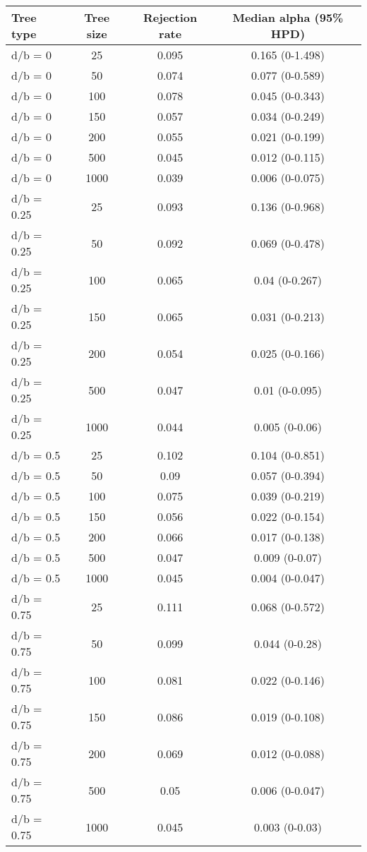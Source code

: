 \begin{tabular}{lccc}
     \hline
     \textbf{Tree type} & \textbf{Tree size} & \textbf{Rejection rate}  & \textbf{Median alpha (95\% HPD)}    \\
     \hline
     d/b = 0 & 25  & 0.095 & 0.165 (0-1.498)   \\
     d/b = 0 & 50  & 0.074 & 0.077 (0-0.589)   \\
     d/b = 0 & 100 & 0.078 & 0.045 (0-0.343)   \\
     d/b = 0 & 150 & 0.057 & 0.034 (0-0.249)   \\
     d/b = 0 & 200 & 0.055 & 0.021 (0-0.199)   \\
     d/b = 0 & 500 & 0.045 & 0.012 (0-0.115)   \\
     d/b = 0 & 1000  & 0.039 & 0.006 (0-0.075)   \\
     d/b = 0.25  & 25  & 0.093 & 0.136 (0-0.968)   \\
     d/b = 0.25  & 50  & 0.092 & 0.069 (0-0.478)   \\
     d/b = 0.25  & 100 & 0.065 & 0.04 (0-0.267)    \\
     d/b = 0.25  & 150 & 0.065 & 0.031 (0-0.213)   \\
     d/b = 0.25  & 200 & 0.054 & 0.025 (0-0.166)   \\
     d/b = 0.25  & 500 & 0.047 & 0.01 (0-0.095)    \\
     d/b = 0.25  & 1000  & 0.044 & 0.005 (0-0.06)    \\
     d/b = 0.5 & 25  & 0.102 & 0.104 (0-0.851)   \\
     d/b = 0.5 & 50  & 0.09  & 0.057 (0-0.394)   \\
     d/b = 0.5 & 100 & 0.075 & 0.039 (0-0.219)   \\
     d/b = 0.5 & 150 & 0.056 & 0.022 (0-0.154)   \\
     d/b = 0.5 & 200 & 0.066 & 0.017 (0-0.138)   \\
     d/b = 0.5 & 500 & 0.047 & 0.009 (0-0.07)    \\
     d/b = 0.5 & 1000  & 0.045 & 0.004 (0-0.047)   \\
     d/b = 0.75  & 25  & 0.111 & 0.068 (0-0.572)   \\
     d/b = 0.75  & 50  & 0.099 & 0.044 (0-0.28)    \\
     d/b = 0.75  & 100 & 0.081 & 0.022 (0-0.146)   \\
     d/b = 0.75  & 150 & 0.086 & 0.019 (0-0.108)   \\
     d/b = 0.75  & 200 & 0.069 & 0.012 (0-0.088)   \\
     d/b = 0.75  & 500 & 0.05  & 0.006 (0-0.047)   \\
     d/b = 0.75  & 1000  & 0.045 & 0.003 (0-0.03)    \\
     \hline
\end{tabular}